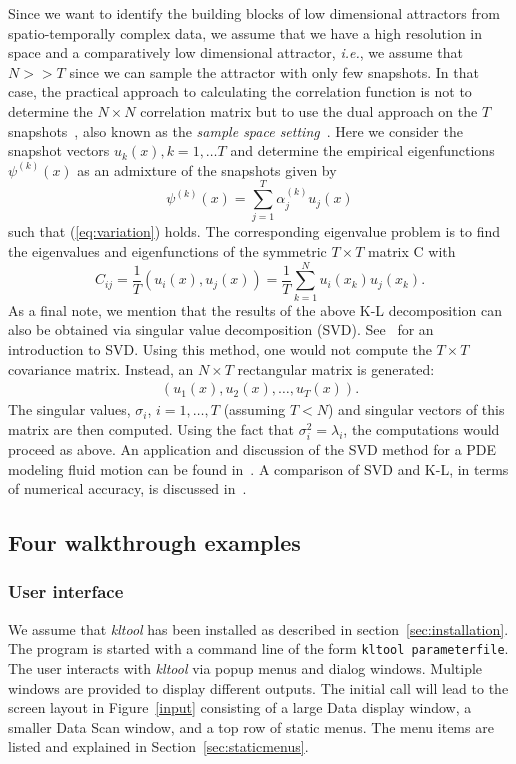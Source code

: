 Since we want to identify the building 
blocks of low dimensional attractors from spatio-temporally complex data,
we assume that we have a high resolution in space and a comparatively
low dimensional attractor, {\sl i.e.}, we assume that
$N >> T$ since we can sample
the attractor with only few snapshots.  In that case, the
practical approach to calculating the correlation function is not to 
determine the $N \times N$ correlation matrix but to use the dual
approach on the $T$ snapshots~\cite{sir},
also known as the {\sl sample space setting}~\cite{pre}.
Here we consider the snapshot vectors $u_k(x), k= 1,\ldots T$ and
determine the empirical eigenfunctions $\psi^{(k)}(x)$
as an admixture of the snapshots given by
\begin{equation}
\psi^{(k)}(x) = \sum_{j=1}^T \alpha_j^{(k)} u_j(x)
\end{equation}
such that (\ref{eq:variation})
holds. The corresponding eigenvalue problem is to find the
eigenvalues and eigenfunctions of the symmetric $T \times T$ matrix C with
\begin{displaymath}
C_{ij} = \frac{1}{T} (u_i(x),u_j(x))
	= \frac{1}{T} \sum_{k=1}^N u_i(x_k)u_j(x_k).
\end{displaymath}
As a final note, we mention that the results of the above K-L decomposition can also be obtained via singular value decomposition (SVD).
See~\cite{strang} for an introduction to SVD.
Using this method, one would not compute the $T \times T$ covariance matrix.
Instead, an $N \times T$ rectangular matrix is generated:
\begin{eqnarray*}
\left( u_1(x),u_2(x), \ldots ,u_T(x)\right).
\end{eqnarray*}
The singular values, ${\sigma}_i$, $i=1,\ldots,T$ (assuming $T <N$)
and singular vectors of this matrix are then computed.            
Using the fact that ${\sigma}_i^2 = \lambda_i$, the computations would
proceed as above.
An application and discussion of the SVD method for a PDE modeling
fluid motion can be found in~\cite{newell}.
A comparison of SVD and K-L, in terms of
numerical accuracy, is discussed in~\cite{mees}.


\subsection{Four walkthrough examples}
\subsubsection{User interface}
We assume that {\sl kltool} has been installed as described in
section~\ref{sec:installation}.
The program is started with a command line of the form
{\tt kltool parameterfile}. 
The user interacts with {\sl kltool} via popup menus and dialog windows.
Multiple windows are provided to display different outputs.
The initial call will lead to the  screen layout in Figure~\ref{input}
consisting  of a large Data display window,
a smaller Data Scan window, and a top row of static menus.
The menu items are listed and explained in Section~\ref{sec:staticmenus}.


